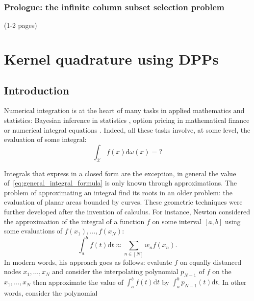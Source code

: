 \documentclass[twoside,11pt]{book}
\numberwithin{theorem}{chapter}
\numberwithin{definition}{chapter}
\numberwithin{proposition}{chapter}
\numberwithin{corollary}{chapter}
\numberwithin{example}{chapter}
\numberwithin{lemma}{chapter}
\begin{document}
\subsection{Prologue: the infinite column subset selection problem} (1-2 pages)

\clearpage

\chapter{Kernel quadrature using DPPs}
\section{Introduction}
Numerical integration is at the heart of many tasks in applied mathematics and statistics: Bayesian inference in statistics \citep{RoCa04}, option pricing in mathematical finance \citep{Gla13} or numerical integral equations \citep{KrMaKo89}. Indeed, all these tasks involve, at some level, the evaluation of some integral:
\begin{equation}\label{eq:general_integral_formula}
\int_{\mathcal{X}}f(x)\mathrm{d}\omega(x)  =  ?
\end{equation}

Integrals that express in a closed form are the exception, in general the value of~\eqref{eq:general_integral_formula} is only known through approximations. The problem of approximating an integral find its roots in an older problem: the evaluation of planar areas bounded by curves. These geometric techniques were further developed after the invention of calculus. For instance, Newton considered the approximation of the integral of a function $f$ on some interval $[a,b]$ using some evaluations of $f(x_{1}), \dots, f(x_{N})$:
\begin{equation}
\int_{a}^{b}f(t)\mathrm{d}t \approx \sum\limits_{n \in [N]}w_{n}f(x_{n}).
\end{equation}
 In modern words, his approach goes as follows: evaluate $f$ on equally distanced nodes $x_{1}, \dots, x_{N}$ and consider the interpolating polynomial $p_{N-1}$ of $f$ on the $x_{1}, \dots, x_{N}$ then approximate the value of $\displaystyle \int_{a}^{b}f(t)\mathrm{d}t$ by $\displaystyle \int_{a}^{b}p_{N-1}(t)\mathrm{d}t$. In other words, consider the polynomial
\end{document}
